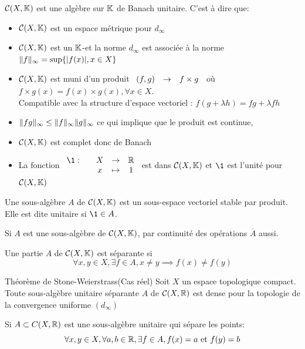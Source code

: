 \documentclass[]{report}
\begin{document}
    $\mathcal{C}(X,\mathbb{K})$ est une algèbre sur $\mathbb{K}$ de Banach unitaire. C'est à dire que:
    \begin{itemize}
        \item $\mathcal{C}(X,\mathbb{K})$ est un espace métrique pour $d_\infty$
        \item $\mathcal{C}(X,\mathbb{K})$ est un $\mathbb{K}$-\ev et la norme $d_\infty$ est associée à la norme $\lVert f \rVert_\infty=\sup \{|f(x)|,x\in X\}$
        \item $\mathcal{C}(X,\mathbb{K})$ est muni d'un produit $\begin{array}{ccccc} (f,g) & \to & f\times g \end{array}$ où $f\times g(x)=f(x)\times g(x),\forall x\in X$.\\
        Compatible avec la structure d'espace vectoriel : $f(g+\lambda h)=f g+\lambda f h$
        \item $\lVert fg \rVert_\infty\le \lVert f \rVert_\infty\lVert g \rVert_\infty$ ce qui implique que le produit est continue,
        \item $\mathcal{C}(X,\mathbb{K})$ est complet donc de Banach
        \item La fonction $\fundfto{\1}{X}{\R}{x}{1}$ est dans $\mathcal{C}(X,\mathbb{K})$ et $\1$ est l'unité pour $\mathcal{C}(X,\mathbb{K})$
    \end{itemize}

    \begin{df}{}{}
        Une sous-algèbre $A$ de $\mathcal{C}(X,\mathbb{K})$ est un sous-espace vectoriel stable par produit. Elle est dite unitaire si $\1\in A$.
    \end{df}

    \begin{re}{}{}
        Si $A$ est une sous-algèbre de $\mathcal{C}(X,\mathbb{K})$, par continuité des opérations $\overline{A}$ aussi.
    \end{re}

    \begin{df}{}{}
        Une partie $A$ de $\mathcal{C}(X,\mathbb{K})$ est séparante si
        \[\forall x,y\in X,\exists f\in A, x\neq y\implies f(x)\neq f(y)\]
    \end{df}

    \begin{tm}{Théorème de Stone-Weierstrass(Cas réel)}{}
        Soit $X$ un espace topologique compact. Toute sous-algèbre unitaire séparante $A$ de $\mathcal{C}(X,\mathbb{R})$ est dense pour la topologie de la convergence uniforme $(d_\infty)$
    \end{tm}

    \begin{lm}{}{}
        Si $A\subset C(X,\mathbb{R})$ est une sous-algèbre unitaire qui sépare les points:
        \[\forall x,y\in X,\forall a,b\in \mathbb{R},\exists f\in A, f(x)=a\text{ et }f(y)=b\]
    \end{lm}
\end{document}
